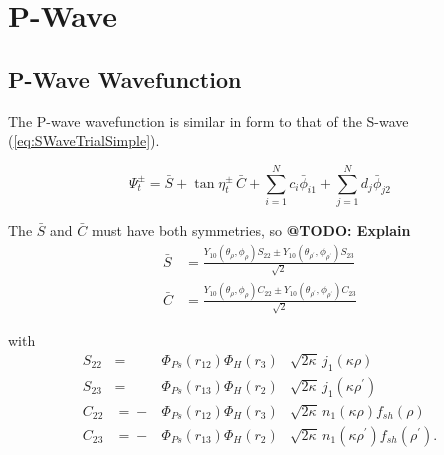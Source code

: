 \documentclass[Dissertation.tex]{subfiles}
\begin{document}
\chapter{P-Wave}
\label{chp:PWave}

\section{P-Wave Wavefunction}
The P-wave wavefunction is similar in form to that of the S-wave (\ref{eq:SWaveTrialSimple}).

\begin{equation}
\Psi_t^\pm = \bar{S} + \tan \eta_t^\pm \, \bar{C} + \sum_{i=1}^N c_i \bar{\phi}_{i1} + \sum_{j=1}^N d_j \bar{\phi}_{j2}
\label{eq:PWaveSimple}
\end{equation}

\noindent The $\bar{S}$ and $\bar{C}$ must have both symmetries, so \textbf{@TODO: Explain}
\begin{subequations}
\label{eq:PWaveSandCBar}
\begin{align}
\bar{S} &= \frac{Y_{10}(\theta_\rho,\phi_\rho)S_{22} \pm Y_{10}(\theta_{\rho^\prime},\phi_{\rho^\prime})S_{23} }{\sqrt{2}} \label{eq:PWaveSBar} \\
\bar{C} &= \frac{Y_{10}(\theta_\rho,\phi_\rho)C_{22} \pm Y_{10}(\theta_{\rho^\prime},\phi_{\rho^\prime})C_{23} }{\sqrt{2}} \label{eq:PWaveCBar} 
\end{align}
\end{subequations}

\noindent with
\begin{subequations}
\label{eq:PWaveSandC}
\begin{alignat}{2}
S_{22} &={}&\Phi_{Ps}\left(r_{12}\right) \Phi_H\left(r_3\right) &\sqrt{2\kappa} \,j_1\!\left(\kappa\rho\right) \label{eq:PWaveS22Def} \\
S_{23} &={}&\Phi_{Ps}\left(r_{13}\right) \Phi_H\left(r_2\right) &\sqrt{2\kappa} \,j_1\!\left(\kappa\rho^\prime\right) \label{eq:PWaveS23Def} \\
C_{22} &={}-&\Phi_{Ps}\left(r_{12}\right) \Phi_H\left(r_3\right) &\sqrt{2\kappa} \,n_1\!\left(\kappa\rho\right) f_{sh}(\rho) \label{eq:PWaveC22Def} \\
C_{23} &={}-&\Phi_{Ps}\left(r_{13}\right) \Phi_H\left(r_2\right) &\sqrt{2\kappa} \,n_1\!\left(\kappa\rho^\prime\right) f_{sh}(\rho^\prime). \label{eq:PWaveC23Def}
\end{alignat}
\end{subequations}
\end{document}

